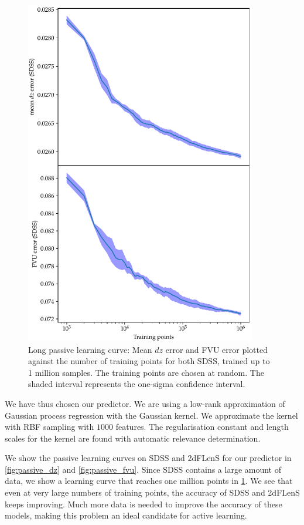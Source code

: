 \documentclass[11pt,twoside,openright]{report}
\begin{document}
  \begin{figure}
    \centering
    \includegraphics[width=0.9\textwidth]{passive_1M.pdf}
    \caption{Long passive learning curve: Mean $dz$ error and FVU error plotted against the number of training points for both SDSS, trained up to 1 million samples. The training points are chosen at random. The shaded interval represents the one-sigma confidence interval.}
    \label{fig:passive_1M}
  \end{figure}

We have thus chosen our predictor. We are using a low-rank approximation of Gaussian process regression with the Gaussian kernel. We approximate the kernel with RBF sampling with $1000$ features. The regularisation constant and length scales for the kernel are found with automatic relevance determination.

We show the passive learning curves on SDSS and 2dFLenS for our predictor in \cref{fig:passive_dz} and \cref{fig:passive_fvu}. Since SDSS contains a large amount of data, we show a learning curve that reaches one million points in \cref{fig:passive_1M}. We see that even at very large numbers of training points, the accuracy of SDSS and 2dFLenS keeps improving. Much more data is needed to improve the accuracy of these models, making this problem an ideal candidate for active learning.
\end{document}
